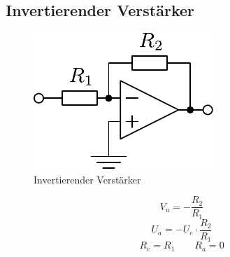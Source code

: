 



\subsection{Invertierender Verstärker}
\begin{figure}[h!]
	\centering
	\includegraphics[scale=\schscale]{op_inv.pdf}
	\caption{Invertierender Verstärker}
	\label{sch:op-inv}
\end{figure}
\[ V_u = - \frac{R_2}{R_1} \]
\[ U_a = - U_e \cdot \frac{R_2}{R_1} \]
\[ R_e = R_1 \qquad R_a = 0 \]